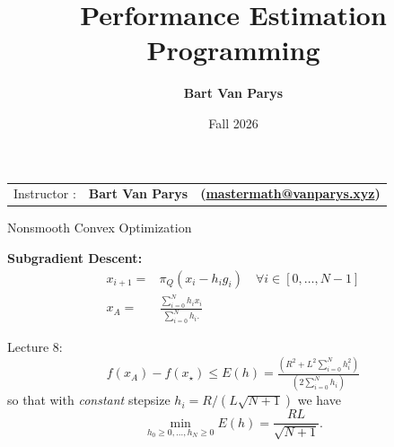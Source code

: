 \documentclass[9pt]{beamer}
\title[Continuous Optimization]{Performance Estimation Programming}
\author[]{\textbf{Bart Van Parys}}
\date[]{Fall 2026}
\begin{document}
\begin{frame}

  \maketitle

  \vspace{-2em}

    \begin{center}
    \begin{tabular}{lll}
      Instructor : & \textbf{Bart Van Parys} & \textbf{(\href{mailto:mastermath@vanparys.xyz}{mastermath@vanparys.xyz})} \\
    \end{tabular}
  \end{center}

\end{frame}

\begin{frame}[label=averaging]{Nonsmooth Convex Optimization}

  \textbf{Subgradient Descent:}
  \begin{align*}
    x_{i+1} = & \pi_{Q}(x_i - h_i g_i) \quad \forall i \in [0, \dots, N-1]\\                                     
    x_{A} = & \textstyle \tfrac{\sum_{i=0}^N h_i x_i}{\sum_{i=0}^N h_i.}
  \end{align*}
  
  \vfill  
  Lecture 8:
  \[
    f(x_{A}) - f(x_\star) \leq E(h) = \textstyle\tfrac{(R^2 + L^2\sum_{i=0}^N h_i^2)}{(2\sum_{i=0}^N h_i)}
  \]
  so that with \textit{constant} stepsize $h_i = R/(L\sqrt{N+1})$ we have $$\min_{h_0\geq 0, \dots, h_{N}\geq 0} E(h) = \frac{RL}{\sqrt{N+1}}.$$
  
\end{frame}
\end{document}
